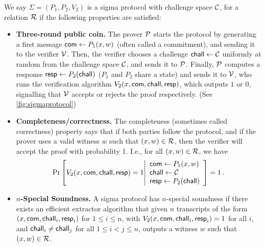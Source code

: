 \begin{definition} \label{def:sigmaprot}
We say $\Sigma = (P_1,P_2,V_2)$ is a sigma protocol with challenge space $\mathcal{C}$, for a relation $\mathcal{R}$ if the following properties are satisfied:

\begin{itemize}
    \item {\bf Three-round public coin.} The prover $\mathcal{P}$ starts the protocol by generating a first message $\mathsf{com} \gets P_1(x,w)$ (often called a commitment), and sending it to the verifier $\mathcal{V}$. Then, the verifier chooses a challenge $\mathsf{chall} \gets \mathcal{C}$ uniformly at random from the challenge space $\mathcal{C}$, and sends it to $\mathcal{P}$. Finally, $\mathcal{P}$ computes a response $\mathsf{resp} \gets P_2(\mathsf{chall})$ ($P_1$ and $P_2$ share a state) and sends it to $\mathcal{V}$, who runs the verification algorithm $V_2(x,\mathsf{com},\mathsf{chall},\mathsf{resp})$, which outputs $1$ or $0$, signalling that $\mathcal{V}$ accepts or rejects the proof respectively. (See \cref{fig:sigmaprotocol})
    
    \item {\bf Completeness/correctness.} The completeness (sometimes called correctness) property says that if both parties follow the protocol, and if the prover uses a valid witness $w$ such that $(x,w) \in \mathcal{R}$, then the verifier will accept the proof with probability 1. I.e., for all $(x,w) \in \mathcal{R}$, we have \[
\Pr \left[ V_2(x,\mathsf{com},\mathsf{chall},\mathsf{resp}) = 1 \middle| \begin{array}{l} \mathsf{com} \gets P_1(x,w) \\ \mathsf{chall} \gets \mathcal{C} \\ \mathsf{resp} \gets P_2(\mathsf{chall}) \end{array} \right] = 1 \, . 
\]

    \item {\bf $n$-Special Soundness.} A sigma protocol has $n$-special soundness if there exists an efficient extractor algorithm that given $n$ transcripts of the form $(x,\mathsf{com},\mathsf{chall}_i,\mathsf{resp}_i)$ for $1 \le i \le n$, with $V_2(x,\mathsf{com},\mathsf{chall}_i,\mathsf{resp}_i) =  1$ for all $i$, and $\mathsf{chall}_i \neq \mathsf{chall}_j$ for all $1 \le i < j \le n$, outputs a witness $w$ such that $(x,w) \in \mathcal{R}$. 
    

\end{itemize}
\end{definition}
